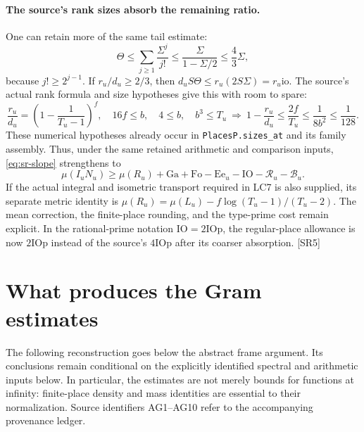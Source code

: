 \documentclass[11pt,a4paper]{article}
\numberwithin{equation}{section}
\theoremstyle{remark}\newtheorem{remark}[theorem]{Remark}
\begin{document}
\paragraph{The source's rank sizes absorb the remaining ratio.}
One can retain more of the same tail estimate:
\[
 \Theta\le\sum_{j\ge1}\frac{\Sigma^j}{j!}
 \le\frac{\Sigma}{1-\Sigma/2}\le\frac43\Sigma,
\]
because $j!\ge2^{j-1}$. If $r_u/d_u\ge2/3$, then
$d_uS\Theta\le r_u(2S\Sigma)=r_u\mathrm{io}$.
The source's actual rank formula and size hypotheses give this with room
to spare:
\[
 \frac{r_u}{d_u}=\left(1-\frac1{T_u-1}\right)^f,
 \quad16f\le b,\quad4\le b,\quad b^3\le T_u
 \ \Longrightarrow\ 
 1-\frac{r_u}{d_u}\le\frac{2f}{T_u}
 \le\frac1{8b^2}\le\frac1{128}.
\]
These numerical hypotheses already occur in \texttt{PlacesP.sizes\_at}
and its family assembly. Thus, under the same retained arithmetic and
comparison inputs, \eqref{eq:sr-slope} strengthens to
\begin{equation}\label{eq:sr-final}
 \boxed{\mu(I_uN_u)\ge\mu(R_u)+\mathrm{Ga}+\mathrm{Fo}-\mathrm{Ee}_u
 -\mathrm{IO}-\mathcal R_u-\mathcal B_u.}
\end{equation}
If the actual integral and isometric transport required in LC7 is also
supplied, its separate metric identity is
$\mu(R_u)=\mu(L_u)-f\log(T_u-1)/(T_u-2)$.
The mean correction, the finite-place rounding, and the type-prime cost
remain explicit. In the rational-prime notation $\mathrm{IO}=2\mathrm{IOp}$,
the regular-place allowance is now $2\mathrm{IOp}$ instead of the source's
$4\mathrm{IOp}$ after its coarser absorption. \textsf{[SR5]}

\section{What produces the Gram estimates}
\label{sec:actual-gram}

The following reconstruction goes below the abstract frame argument.
Its conclusions remain conditional on the explicitly identified
spectral and arithmetic inputs below.  In particular, the estimates
are not merely bounds for functions at infinity: finite-place
density and mass identities are essential to their normalization.
Source identifiers AG1--AG10 refer to the accompanying provenance ledger.\cite{actual-gram-kernel,actual-gram-words}
\end{document}
